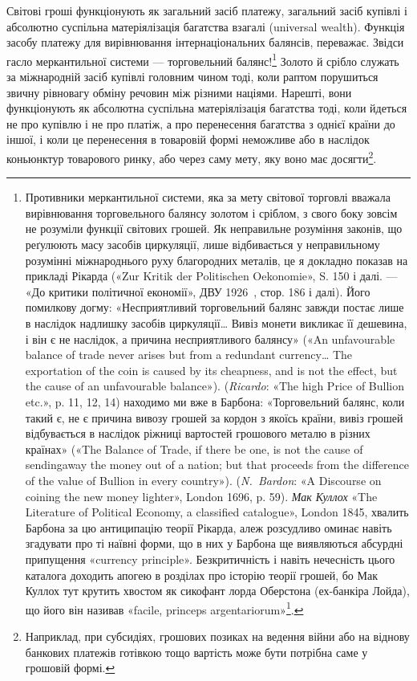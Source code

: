 Світові гроші функціонують як загальний засіб платежу,
загальний засіб купівлі і абсолютно суспільна матеріялізація
багатства взагалі (universal wealth). Функція засобу платежу
для вирівнювання інтернаціональних балянсів, переважає. Звідси
гасло меркантильної системи — торговельний балянс!\footnote{
Противники меркантильної системи, яка за мету світової торговлі
вважала вирівнювання торговельного балянсу золотом і сріблом, з свого
боку зовсім не розуміли функції світових грошей. Як неправильне розуміння
законів, що реґулюють масу засобів циркуляції, лише відбивається
у неправильному розумінні міжнароднього руху благородних металів,
це я докладно показав на прикладі Рікарда («Zur Kritik der Politischen
Oekonomie», S. 150 і далі. — «До критики політичної економії», ДВУ
1926~, стор. 186 і далі). Його помилкову догму: «Несприятливий торговельний
балянс завжди постає лише в наслідок надлишку засобів циркуляції\dots{}
Вивіз монети викликає її дешевина, і він є не наслідок, а причина
несприятливого балянсу» («An unfavourable balance of trade never
arises but from a redundant currency\dots{} The exportation of the coin is caused
by its cheapness, and is not the effect, but the cause of an unfavourable
balance»). (\emph{Ricardo}: «The high Price of Bullion etc.», p. 11, 12, 14)
находимо ми вже в Барбона: «Торговельний балянс, коли такий є, не
є причина вивозу грошей за кордон з якоїсь країни, вивіз грошей відбувається
в наслідок ріжниці вартостей грошового металю в різних країнах»
(«The Balance of Trade, if there be one, is not the cause of sendingaway
the money out of a nation; but that proceeds from the difference of the value
of Bullion in every country»). (\emph{N.~Bardon}: «A Discourse on coining
the new money lighter», London 1696, p. 59). \emph{Мак Куллох} «The Literature
of Political Economy, a classified catalogue», London 1845, хвалить
Барбона за цю антиципацію теорії Рікарда, алеж розсудливо оминає
навіть згадувати про ті наївні форми, що в них у Барбона ще виявляються
абсурдні припущення «currency principle». Безкритичність і навіть нечесність
цього каталога доходить апогею в розділах про історію теорії
грошей, бо Мак Куллох тут крутить хвостом як сикофант лорда Оберстона
(ех-банкіра Лойда), що його він називав «facile, princeps argentariorum»\footnote*{
безперечним головою банкірів. \emph{Ред.}
}.
} Золото й срібло служать за міжнародній засіб купівлі головним чином
тоді, коли раптом порушиться звичну рівновагу обміну речовин
між різними націями. Нарешті, вони функціонують як абсолютна
суспільна матеріялізація багатства тоді, коли йдеться не
про купівлю і не про платіж, а про перенесення багатства з однієї
країни до іншої, і коли це перенесення в товаровій формі неможливе
або в наслідок коньюнктур товарового ринку, або через
саму мету, яку воно має досягти\footnote{
Наприклад, при субсидіях, грошових позиках на ведення війни
або на віднову банкових платежів готівкою тощо вартість може бути потрібна
саме у грошовій формі.
}.

